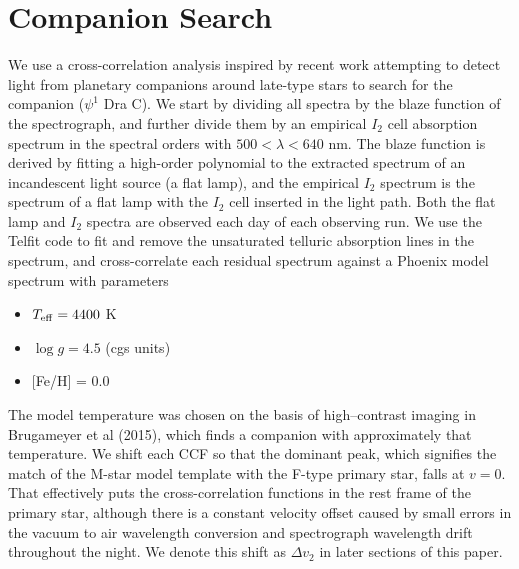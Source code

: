 \documentclass[twocolumn]{emulateapj}
\begin{document}
 
 
 


\section{Companion Search}
\label{sec:method}

We use a cross-correlation analysis inspired by recent work attempting to detect light from planetary companions around late-type stars \citep{Gullikson2013, Martins2013} to search for the companion ($\psi^1$ Dra C). We start by dividing all spectra by the blaze function of the spectrograph, and further divide them by an empirical $I_2$ cell absorption spectrum in the spectral orders with $500 < \lambda < 640$ nm. The blaze function is derived by fitting a high-order polynomial to the extracted spectrum of an incandescent light source (a flat lamp), and the empirical $I_2$ spectrum is the spectrum of a flat lamp with the $I_2$ cell inserted in the light path. Both the flat lamp and $I_2$ spectra are observed each day of each observing run. We use the Telfit code \citep{Gullikson2014} to fit and remove the unsaturated telluric absorption lines in the spectrum, and cross-correlate each residual spectrum against a Phoenix model spectrum \citep{Husser2013} with parameters

\begin{itemize}
\item $T_{\rm eff} = 4400$ K
\item $\log{g} = 4.5$ (cgs units)
\item {[}Fe/H{]} = 0.0
\end{itemize}

The model temperature was chosen on the basis of high--contrast imaging in Brugameyer et al (2015), which finds a companion with approximately that temperature. We shift each CCF so that the dominant peak, which signifies the match of the M-star model template with the F-type primary star, falls at $v=0$. That effectively puts the cross-correlation functions in the rest frame of the primary star, although there is a constant velocity offset caused by small errors in the vacuum to air wavelength conversion and spectrograph wavelength drift throughout the night. We denote this shift as $\Delta v_2$ in later sections of this paper.
\end{document}
